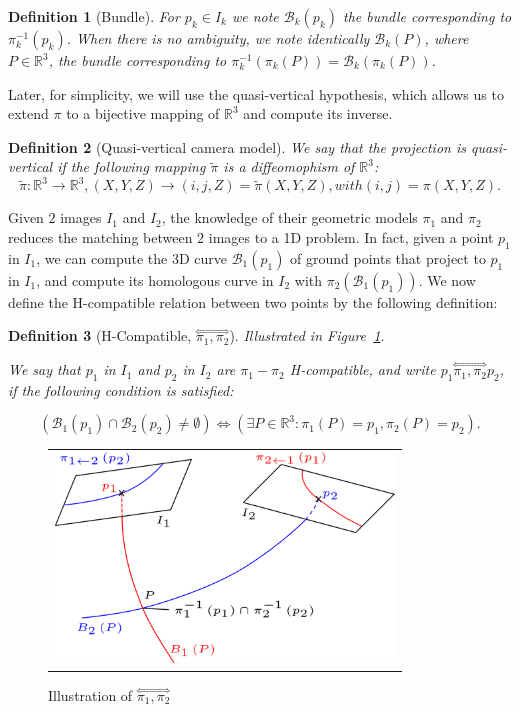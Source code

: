\documentclass{ipol}
\newcommand{\RR}{\ensuremath{\mathbb{R}}}
\newcommand{\HComp}{\overset{\Longleftrightarrow}{\scriptscriptstyle \pi_1,\pi_2}}
\newcommand{\Bund}[1]{\ensuremath{\mathcal{B}_{#1}}}
\newcommand{\BundO}{\Bund{1}}
\newcommand{\BundT}{\Bund{2}}
\newcommand{\BundK}{\Bund{k}}
\newcommand{\PiVert}{\widetilde{\pi}}
\newtheorem{definition}{Definition}
\begin{document}
\begin{definition}[Bundle]
For $p_k \in I_k$ we note $\BundK(p_k)$  the bundle corresponding 
to $\pi_k^{-1}(p_k)$. When there is no ambiguity,
we note identically  $\BundK(P)$, where $P\in \RR^3$,
 the bundle corresponding to $\pi_k^{-1}(\pi_k(P)) = \BundK(\pi_k(P))$.
\end{definition}


\noindent Later, for simplicity, we will use the  {quasi-vertical} hypothesis, which allows us to extend $\pi$ to a
bijective mapping of $\RR^3$ and compute its inverse.

\begin{definition}[Quasi-vertical camera model]  
We say that the projection is quasi-vertical if the following mapping $\PiVert$ is a diffeomophism of $\RR^3$:
\begin{equation}
  \PiVert :  \RR^3  \rightarrow \RR^3  ,  (X,Y,Z)  \rightarrow (i,j,Z) = \PiVert(X,Y,Z)  , with (i,j) = \pi(X,Y,Z). \label{PiInvert}
\end{equation}
\end{definition}
%
Given $2$ images $I_1$ and $I_2$, the knowledge  of their geometric models $\pi_1$ and  $\pi_2$
reduces the matching between $2$ images to a 1D problem. In fact, given a point $p_1$ in $I_1$,
we can compute the 3D curve $\BundO(p_1)$ of  ground points that project to $p_1$ in $I_1$, and compute its
homologous curve in $I_2$ with $\pi_2(\BundO(p_1))$. We now define the H-compatible relation between two points
by the following definition:

\begin{definition}[H-Compatible, $\HComp$] 
\emph{Illustrated in Figure~\ref{FigNotaComp}.}

We say that $p_1$ in  $I_1$ and $p_2$ in $I_2$ are  $\pi_1-\pi_2$ H-compatible, and write $p_1 \HComp p_2$, if   the following condition is satisfied:

\begin{equation}
   ( \BundO(p_1) \cap  \BundT(p_2) \neq \emptyset    )
    \Leftrightarrow
  (\exists P \in  \RR^3 : \pi_1(P) =p_1 ,  \pi_2(P) = p_2).
\end{equation}
\end{definition}

\begin{figure}[htb!]
\centering
\begin{tabular}{c}
\includegraphics[width=9cm]{FIGS/NotaBundle.png} 
\end{tabular}
\caption{Illustration of $\HComp$}
\label{FigNotaComp}
\end{figure}
\end{document}
